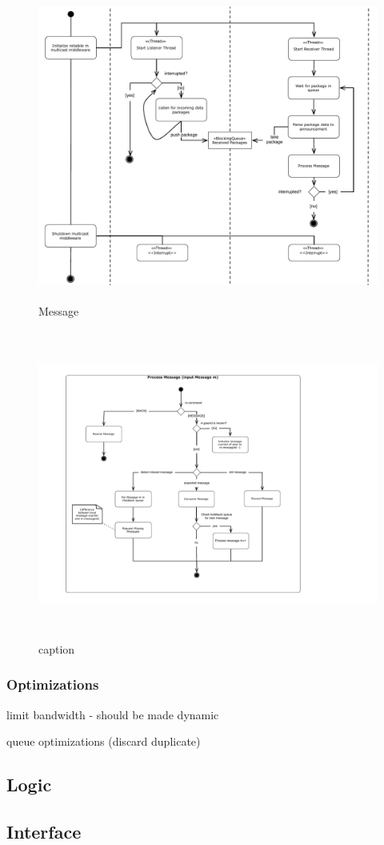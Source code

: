 \begin{figure}[htbp]
    \centering
        \includegraphics[height=4in]{figures/receivePackets.pdf}
    \caption{Message}
    \label{fig:figures_processReceivePackage}
\end{figure}

\begin{figure}[htbp]
    \centering
        \includegraphics[height=4in]{figures/processMessages.pdf}
    \caption{caption}
    \label{fig:figures_processMessages}
\end{figure}



\subsubsection{Optimizations}

limit bandwidth 
    - should be made dynamic
    
queue optimizations (discard duplicate)

\subsection{Logic}


\subsection{Interface}